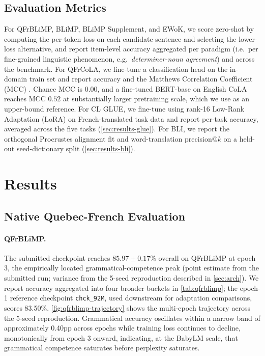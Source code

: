 \documentclass[11pt]{article}
\begin{document}
\subsection{Evaluation Metrics}
\label{sec:eval-metrics}

For QFrBLiMP, BLiMP, BLiMP Supplement, and EWoK, we score zero-shot by computing the per-token loss on each candidate sentence and selecting the lower-loss alternative, and report item-level accuracy aggregated per paradigm (i.e.\ per fine-grained linguistic phenomenon, e.g.\ \emph{determiner-noun agreement}) and across the benchmark. For QFrCoLA, we fine-tune a classification head on the in-domain train set and report accuracy and the Matthews Correlation Coefficient (MCC) \citep{matthews1975coefficient}. Chance MCC is 0.00, and a fine-tuned BERT-base on English CoLA reaches MCC $0.52$ at substantially larger pretraining scale, which we use as an upper-bound reference. For CL GLUE, we fine-tune using rank-16 Low-Rank Adaptation (LoRA) \citep{hu2021lora} on French-translated task data and report per-task accuracy, averaged across the five tasks (\autoref{sec:results-glue}). For BLI, we report the orthogonal Procrustes alignment fit and word-translation precision@$k$ on a held-out seed-dictionary split (\autoref{sec:results-bli}).

\section{Results}
\label{sec:results}

\subsection{Native Quebec-French Evaluation}
\label{sec:results-native}

\paragraph{QFrBLiMP.}
The submitted checkpoint reaches $85.97 \pm 0.17$\% overall on QFrBLiMP at epoch 3, the empirically located grammatical-competence peak (point estimate from the submitted run; variance from the 5-seed reproduction described in \autoref{sec:arch}). We report accuracy aggregated into four broader buckets in \autoref{tab:qfrblimp}; the epoch-1 reference checkpoint \texttt{chck\_92M}, used downstream for adaptation comparisons, scores 83.50\%. \autoref{fig:qfrblimp-trajectory} shows the multi-epoch trajectory across the 5-seed reproduction. Grammatical accuracy oscillates within a narrow band of approximately 0.40pp across epochs while training loss continues to decline, monotonically from epoch 3 onward, indicating, at the BabyLM scale, that grammatical competence saturates before perplexity saturates. 
\end{document}
